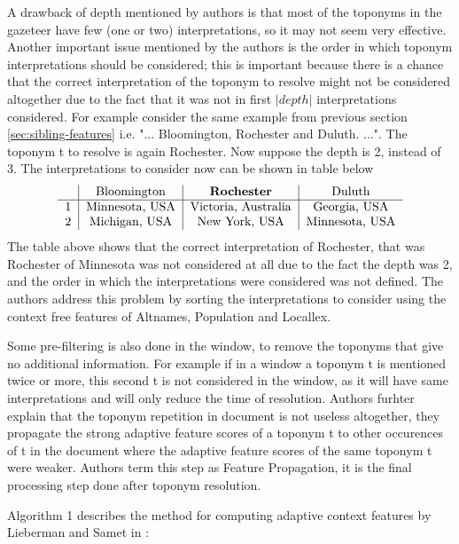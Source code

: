 \documentclass[
     11pt,         %
     a4paper,      %
     oneside,
     ]{article}
\begin{document}
A drawback of depth mentioned by authors is that most of the toponyms in the gazeteer have few (one or two) interpretations, so it may not seem very effective. Another important issue mentioned by the authors is the order in which toponym interpretations should be considered; this is important because there is a chance that the correct interpretation of the toponym to resolve might not be considered altogether due to the fact that it was not in first $|depth|$ interpretations considered. For example consider the same example from previous section \ref{sec:sibling-features} i.e. "... Bloomington, Rochester and Duluth. ...". The toponym t to resolve is again Rochester. Now suppose the depth is 2, instead of 3. The interpretations to consider now can be shown in table below
$$
\begin{tabular}{ c| c | c | c}

{} & Bloomington & \textbf{Rochester} & Duluth \\
\hline
1 & Minnesota, USA & Victoria, Australia & Georgia, USA\\
2 & Michigan, USA & New York, USA & Minnesota, USA\\
\end{tabular}
$$
The table above shows that the correct interpretation of Rochester, that was Rochester of Minnesota was not considered at all due to the fact the depth was 2, and the order in which the interpretations were considered was not defined. The authors address this problem by sorting the interpretations to consider using the context free features of Altnames, Population and Locallex.

Some pre-filtering is also done in the window, to remove the toponyms that give no additional information. For example if in a window a toponym t is mentioned twice or more, this second t is not considered in the window, as it will have same interpretations and will only reduce the time of resolution. Authors furhter explain that the toponym repetition in document is not useless altogether, they propagate the strong adaptive feature scores of a toponym t to other occurences of t in the document where the adaptive feature scores of the same toponym t were weaker. Authors term this step as Feature Propagation, it is the final processing step done after toponym resolution. 

Algorithm 1 describes the method for computing adaptive context features by Lieberman and Samet	in \cite{Lieberman12adaptivecontext}:
\end{document}
